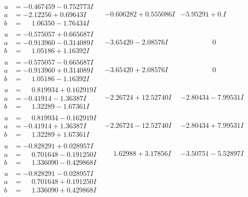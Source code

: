 \documentclass[1p]{elsarticle_modified}
\theoremstyle{definition}
\begin{document}
$$\begin{array}{c|c|c}
\begin{aligned}
u &= -0.467459 - 0.752773 I \\
a &= -2.12256 + 0.69643 I \\
b &= \phantom{-}1.06350 - 1.76434 I\end{aligned}
 & -0.606282 + 0.555086 I & -5.95291 + 0. I\phantom{ +0.000000I} \\ \hline\begin{aligned}
u &= -0.575057 + 0.665687 I \\
a &= -0.913960 - 0.314089 I \\
b &= \phantom{-}1.05186 + 1.16392 I\end{aligned}
 & -3.65420 - 2.08576 I & \phantom{-0.000000 } 0 \\ \hline\begin{aligned}
u &= -0.575057 - 0.665687 I \\
a &= -0.913960 + 0.314089 I \\
b &= \phantom{-}1.05186 - 1.16392 I\end{aligned}
 & -3.65420 + 2.08576 I & \phantom{-0.000000 } 0 \\ \hline\begin{aligned}
u &= \phantom{-}0.819934 + 0.162919 I \\
a &= -0.41914 - 1.36387 I \\
b &= \phantom{-}1.32289 - 1.67361 I\end{aligned}
 & -2.26724 + 12.52740 I & -2.80434 - 7.99531 I \\ \hline\begin{aligned}
u &= \phantom{-}0.819934 - 0.162919 I \\
a &= -0.41914 + 1.36387 I \\
b &= \phantom{-}1.32289 + 1.67361 I\end{aligned}
 & -2.26724 - 12.52740 I & -2.80434 + 7.99531 I \\ \hline\begin{aligned}
u &= -0.828291 + 0.028957 I \\
a &= \phantom{-}0.701648 - 0.191250 I \\
b &= \phantom{-}1.336090 - 0.429868 I\end{aligned}
 & \phantom{-}1.62988 + 3.17856 I & -3.50751 - 5.52897 I \\ \hline\begin{aligned}
u &= -0.828291 - 0.028957 I \\
a &= \phantom{-}0.701648 + 0.191250 I \\
b &= \phantom{-}1.336090 + 0.429868 I\end{aligned}

\end{array}$$
\end{document}
